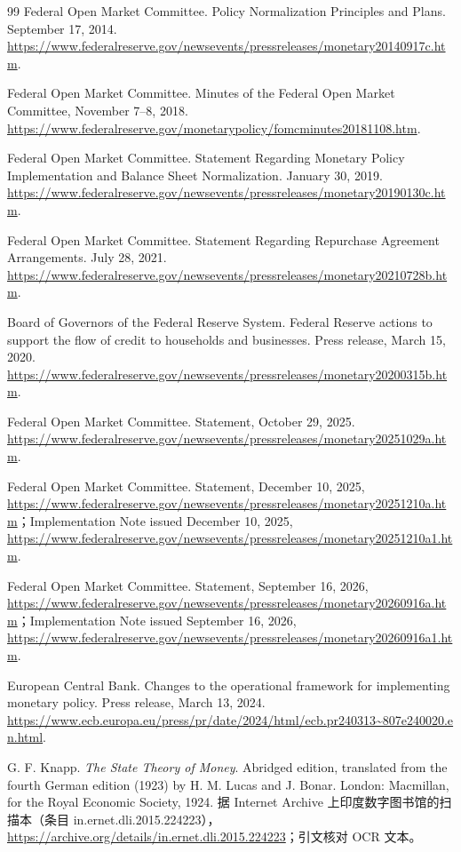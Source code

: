 \begin{thebibliography}{99}
 Federal Open Market Committee. Policy Normalization Principles and Plans. September 17, 2014. \url{https://www.federalreserve.gov/newsevents/pressreleases/monetary20140917c.htm}.

 Federal Open Market Committee. Minutes of the Federal Open Market Committee, November 7--8, 2018. \url{https://www.federalreserve.gov/monetarypolicy/fomcminutes20181108.htm}.

 Federal Open Market Committee. Statement Regarding Monetary Policy Implementation and Balance Sheet Normalization. January 30, 2019. \url{https://www.federalreserve.gov/newsevents/pressreleases/monetary20190130c.htm}.

 Federal Open Market Committee. Statement Regarding Repurchase Agreement Arrangements. July 28, 2021. \url{https://www.federalreserve.gov/newsevents/pressreleases/monetary20210728b.htm}.

 Board of Governors of the Federal Reserve System. Federal Reserve actions to support the flow of credit to households and businesses. Press release, March 15, 2020. \url{https://www.federalreserve.gov/newsevents/pressreleases/monetary20200315b.htm}.

 Federal Open Market Committee. Statement, October 29, 2025. \url{https://www.federalreserve.gov/newsevents/pressreleases/monetary20251029a.htm}.

 Federal Open Market Committee. Statement, December 10, 2025, \url{https://www.federalreserve.gov/newsevents/pressreleases/monetary20251210a.htm}；Implementation Note issued December 10, 2025, \url{https://www.federalreserve.gov/newsevents/pressreleases/monetary20251210a1.htm}.

 Federal Open Market Committee. Statement, September 16, 2026, \url{https://www.federalreserve.gov/newsevents/pressreleases/monetary20260916a.htm}；Implementation Note issued September 16, 2026, \url{https://www.federalreserve.gov/newsevents/pressreleases/monetary20260916a1.htm}.

 European Central Bank. Changes to the operational framework for implementing monetary policy. Press release, March 13, 2024. \url{https://www.ecb.europa.eu/press/pr/date/2024/html/ecb.pr240313~807e240020.en.html}.

 G. F. Knapp. \emph{The State Theory of Money}. Abridged edition, translated from the fourth German edition (1923) by H. M. Lucas and J. Bonar. London: Macmillan, for the Royal Economic Society, 1924. 据 Internet Archive 上印度数字图书馆的扫描本（条目 in.ernet.dli.2015.224223），\url{https://archive.org/details/in.ernet.dli.2015.224223}；引文核对 OCR 文本。


\end{thebibliography}
